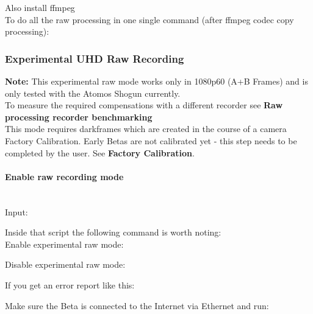 Also install ffmpeg\\

To do all the raw processing in one single command (after ffmpeg codec copy processing): 

	
	
	
	
\subsubsection{Experimental UHD Raw Recording}

\textbf{Note:} This experimental raw mode works only in 1080p60 (A+B Frames) and is only tested with the Atomos Shogun currently. \\

To measure the required compensations with a different recorder see \textbf{Raw processing recorder benchmarking}\\

This mode requires darkframes which are created in the course of a camera Factory Calibration. Early Betas are not calibrated yet - this step needs to be completed by the user. See \textbf{Factory Calibration}.\\




\paragraph{Enable raw recording mode}\mbox{}\\

Input:


Inside that script the following command is worth noting:\\

Enable experimental raw mode: 


Disable experimental raw mode: 


If you get an error report like this: 


Make sure the Beta is connected to the Internet via Ethernet and run:     

